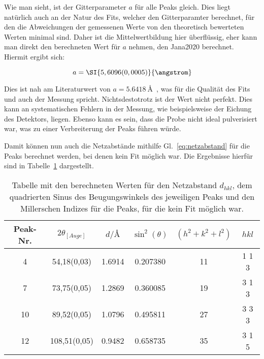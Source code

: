 Wie man sieht, ist der Gitterparameter $a$ für alle Peaks gleich. Dies liegt natürlich auch an der Natur des Fits, welcher den Gitterparamter berechnet, für den die Abweichungen der gemessenen Werte von den theoretisch bewerteten Werten minimal sind. Daher ist die Mittelwertbildung hier überflüssig, eher kann man direkt den berechneten Wert für $a$ nehmen, den Jana2020 berechnet. Hiermit ergibt sich:

\begin{equation}
    a = \SI{5,6096(0,0005)}{\angstrom}
\end{equation}

Dies ist nah am Literaturwert von $a = \SI[]{5,6418}[]{\angstrom}$~\cite[]{FONTANA2011207}, was für die Qualität des Fits und auch der Messung spricht. Nichtsdestotrotz ist der Wert nicht perfekt. Dies kann an systematischen Fehlern in der Messung, wie beispielsweise der Eichung des Detektors, liegen. Ebenso kann es sein, dass die Probe nicht ideal pulverisiert war, was zu einer Verbreiterung der Peaks führen würde.

Damit können nun auch die Netzabstände mithilfe Gl.~\ref{eq:netzabstand} für die Peaks berechnet werden, bei denen kein Fit möglich war. Die Ergebnisse hierfür sind in Tabelle~\ref{tab:gitter2} dargestellt.

\begin{table}[h!]
    \centering
     \begin{tabular}{|c|c|c|c|c|c|} 
     \hline
     Peak-Nr. & $2\theta_{[Auge]}$ & $d/\si{\angstrom}$ & $\sin^2(\theta)$ & $(h^2+k^2+l^2)$&  $h k l $ \\ [0.5ex] 
     \hline\hline
     4 & \num{54,18(0,03)} & 1.6914 & 0.207380 & 11 & 1 1 3 \\
     7 & \num{73,75(0,05)} & 1.2869 & 0.360085 & 19 & 3 1 3\\
     10 & \num{89,52(0,05)}  & 1.0796 & 0.495811 & 27 & 3 3 3 \\
     12 & \num{108,51(0,05)} & 0.9482 & 0.658735 & 35 & 3 1 5 \\
     [1ex] 
     \hline
     \end{tabular}
     \caption[short]{Tabelle mit den berechneten Werten für den Netzabstand $d_{hkl}$, dem quadrierten Sinus des Beugungswinkels des jeweiligen Peaks und den Millerschen Indizes für die Peaks, für die kein Fit möglich war.}
     \label{tab:gitter2}
\end{table}